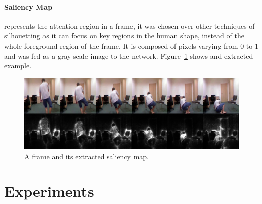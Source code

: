 \documentclass[conference]{IEEEtran}
\begin{document}
\paragraph{Saliency Map} represents the attention region in a frame, it was chosen over other techniques of silhouetting as it can focus on key regions in the human shape, instead of the whole foreground region of the frame. It is composed of pixels varying from 0 to 1 and was fed as a gray-scale image to the network. Figure~\ref{fig:sal} shows and extracted example.
\begin{figure}[htbp]
\centerline{\includegraphics[width=\linewidth]{figures/sal.png}}
\caption{A frame and its extracted saliency map.}
\label{fig:sal}
\end{figure}

\section{Experiments}
\label{sec:experiments}
\end{document}
